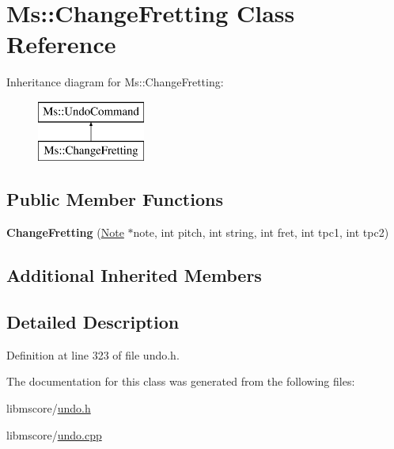 \hypertarget{class_ms_1_1_change_fretting}{}\section{Ms\+:\+:Change\+Fretting Class Reference}
\label{class_ms_1_1_change_fretting}
Inheritance diagram for Ms\+:\+:Change\+Fretting\+:\begin{figure}[H]
\begin{center}
\leavevmode
\includegraphics[height=2.000000cm]{class_ms_1_1_change_fretting}
\end{center}
\end{figure}
\subsection*{Public Member Functions}
\begin{DoxyCompactItemize}
\item 
\mbox{\label{class_ms_1_1_change_fretting_a48e15750803d0d43a443e8d62d2b988e}} 
{\bfseries Change\+Fretting} (\hyperlink{class_ms_1_1_note}{Note} $\ast$note, int pitch, int string, int fret, int tpc1, int tpc2)
\end{DoxyCompactItemize}
\subsection*{Additional Inherited Members}


\subsection{Detailed Description}


Definition at line 323 of file undo.\+h.



The documentation for this class was generated from the following files\+:\begin{DoxyCompactItemize}
\item 
libmscore/\hyperlink{undo_8h}{undo.\+h}\item 
libmscore/\hyperlink{undo_8cpp}{undo.\+cpp}\end{DoxyCompactItemize}
